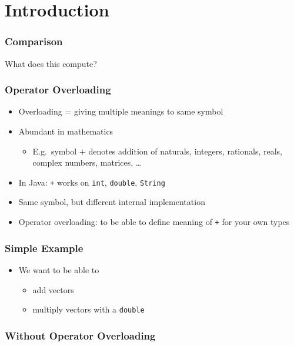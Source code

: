 \section{Introduction}
\frame{\tableofcontents[currentsection]}

\begin{frame}
  \frametitle{Comparison}
  \begin{center}
    What does this compute?
  \end{center}
\end{frame}

\begin{frame}
  \frametitle{Operator Overloading}
  \begin{itemize}
    \item Overloading = giving multiple meanings to same symbol
    \item Abundant in mathematics
          \begin{itemize}
            \item E.g.~symbol $+$ denotes addition of naturals, integers, rationals, reals, complex numbers, matrices, \dots
          \end{itemize}
    \item In Java: {\tt +} works on {\tt int}, {\tt double}, {\tt String}
    \item Same symbol, but different internal implementation
    \item Operator overloading: to be able to define meaning of {\tt +}
          for your own types
  \end{itemize}
\end{frame}

\begin{frame}
  \frametitle{Simple Example}
  \begin{itemize}
    \item We want to be able to
          \begin{itemize}
            \item add vectors
            \item multiply vectors with a \texttt{double}
          \end{itemize}
  \end{itemize}
\end{frame}

\begin{frame}
  \frametitle{Without Operator Overloading}
\end{frame}

